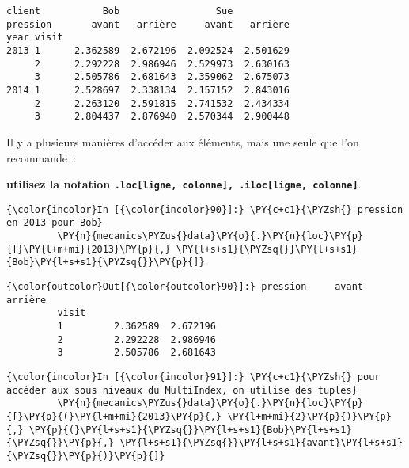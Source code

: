     \begin{Verbatim}[commandchars=\\\{\},frame=single,framerule=0.3mm,rulecolor=\color{cellframecolor}]
client           Bob                 Sue          
pression       avant   arrière     avant   arrière
year visit                                        
2013 1      2.362589  2.672196  2.092524  2.501629
     2      2.292228  2.986946  2.529973  2.630163
     3      2.505786  2.681643  2.359062  2.675073
2014 1      2.528697  2.338134  2.157152  2.843016
     2      2.263120  2.591815  2.741532  2.434334
     3      2.804437  2.876940  2.570344  2.900448
\end{Verbatim}

    Il y a plusieurs manières d'accéder aux éléments, mais une seule que
l'on recommande~:

\textbf{utilisez la notation
\texttt{.loc{[}ligne,\ colonne{]},\ .iloc{[}ligne,\ colonne{]}}}.

    \begin{Verbatim}[commandchars=\\\{\},frame=single,framerule=0.3mm,rulecolor=\color{cellframecolor}]
{\color{incolor}In [{\color{incolor}90}]:} \PY{c+c1}{\PYZsh{} pression en 2013 pour Bob}
         \PY{n}{mecanics\PYZus{}data}\PY{o}{.}\PY{n}{loc}\PY{p}{[}\PY{l+m+mi}{2013}\PY{p}{,} \PY{l+s+s1}{\PYZsq{}}\PY{l+s+s1}{Bob}\PY{l+s+s1}{\PYZsq{}}\PY{p}{]}
\end{Verbatim}


\begin{Verbatim}[commandchars=\\\{\},frame=single,framerule=0.3mm,rulecolor=\color{cellframecolor}]
{\color{outcolor}Out[{\color{outcolor}90}]:} pression     avant   arrière
         visit                       
         1         2.362589  2.672196
         2         2.292228  2.986946
         3         2.505786  2.681643
\end{Verbatim}
            
    \begin{Verbatim}[commandchars=\\\{\},frame=single,framerule=0.3mm,rulecolor=\color{cellframecolor}]
{\color{incolor}In [{\color{incolor}91}]:} \PY{c+c1}{\PYZsh{} pour accéder aux sous niveaux du MultiIndex, on utilise des tuples}
         \PY{n}{mecanics\PYZus{}data}\PY{o}{.}\PY{n}{loc}\PY{p}{[}\PY{p}{(}\PY{l+m+mi}{2013}\PY{p}{,} \PY{l+m+mi}{2}\PY{p}{)}\PY{p}{,} \PY{p}{(}\PY{l+s+s1}{\PYZsq{}}\PY{l+s+s1}{Bob}\PY{l+s+s1}{\PYZsq{}}\PY{p}{,} \PY{l+s+s1}{\PYZsq{}}\PY{l+s+s1}{avant}\PY{l+s+s1}{\PYZsq{}}\PY{p}{)}\PY{p}{]}
\end{Verbatim}


